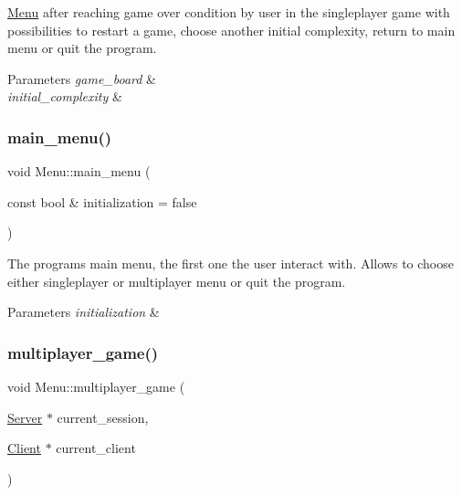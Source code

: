 \hyperlink{classMenu}{Menu} after reaching game over condition by user in the singleplayer game with possibilities to restart a game, choose another initial complexity, return to main menu or quit the program. 


\begin{DoxyParams}{Parameters}
{\em game\+\_\+board} & \\
\hline
{\em initial\+\_\+complexity} & \\
\hline
\end{DoxyParams}
\mbox{\label{classMenu_a6879a11cc8663b9866521c262459e749}} 
\subsubsection{\texorpdfstring{main\+\_\+menu()}{main\_menu()}}
{\footnotesize\ttfamily void Menu\+::main\+\_\+menu (\begin{DoxyParamCaption}\item[{const bool \&}]{initialization = {\ttfamily false} }\end{DoxyParamCaption})}



The program\textquotesingle{}s main menu, the first one the user interact with. Allows to choose either singleplayer or multiplayer menu or quit the program. 


\begin{DoxyParams}{Parameters}
{\em initialization} & \\
\hline
\end{DoxyParams}
\mbox{\label{classMenu_ad0ebc9b36a72588250f2be1771d27673}} 
\subsubsection{\texorpdfstring{multiplayer\+\_\+game()}{multiplayer\_game()}}
{\footnotesize\ttfamily void Menu\+::multiplayer\+\_\+game (\begin{DoxyParamCaption}\item[{\hyperlink{classServer}{Server} $\ast$}]{current\+\_\+session,  }\item[{\hyperlink{classClient}{Client} $\ast$}]{current\+\_\+client }\end{DoxyParamCaption})}



